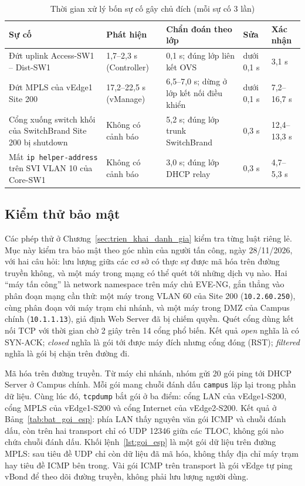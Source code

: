 \begin{table}[H]
    \centering
    \small
    \caption{Thời gian xử lý bốn sự cố gây chủ đích (mỗi sự cố 3 lần)}
    \label{tab:xu_ly_su_co}
    \begin{tabularx}{\textwidth}{|L{3.6cm}|L{2.4cm}|Y|P{1.9cm}|P{2.0cm}|}
        \hline
        \textbf{Sự cố} & \textbf{Phát hiện} & \textbf{Chẩn đoán theo lớp} & \textbf{Sửa} & \textbf{Xác nhận} \\
        \hline
        Đứt uplink Access-SW1 -- Dist-SW1 & 1,7--2,3 s (Controller) & 0,1 s; đúng lớp liên kết OVS & dưới 0,1 s & 3,1 s \\
        \hline
        Đứt MPLS của vEdge1 Site 200 & 17,2--22,5 s (vManage) & 6,5--7,0 s; dừng ở lớp kết nối điều khiển & dưới 0,1 s & 7,2--16,7 s \\
        \hline
        Cổng xuống switch khối của SwitchBrand Site 200 bị shutdown & Không có cảnh báo & 5,2 s; đúng lớp trunk SwitchBrand & 0,3 s & 12,4--13,3 s \\
        \hline
        Mất \texttt{ip helper-address} trên SVI VLAN 10 của Core-SW1 & Không có cảnh báo & 3,0 s; đúng lớp DHCP relay & 0,3 s & 4,7--5,3 s \\
        \hline
    \end{tabularx}
\end{table}

\subsection{Kiểm thử bảo mật}\label{sec:kiem_thu_bao_mat}

Các phép thử ở Chương~\ref{sec:trien_khai_danh_gia} kiểm tra từng luật riêng lẻ. Mục này kiểm tra bảo mật theo góc nhìn của người tấn công, ngày 28/11/2026, với hai câu hỏi: lưu lượng giữa các cơ sở có thực sự được mã hóa trên đường truyền không, và một máy trong mạng có thể quét tới những dịch vụ nào. Hai ``máy tấn công'' là network namespace trên máy chủ EVE-NG, gắn thẳng vào phân đoạn mạng cần thử: một máy trong VLAN 60 của Site 200 (\texttt{10.2.60.250}), cùng phân đoạn với máy trạm chi nhánh, và một máy trong DMZ của Campus chính (\texttt{10.1.1.13}), giả định Web Server đã bị chiếm quyền. Quét cổng dùng kết nối TCP với thời gian chờ 2 giây trên 14 cổng phổ biến. Kết quả \textit{open} nghĩa là có SYN-ACK; \textit{closed} nghĩa là gói tới được máy đích nhưng cổng đóng (RST); \textit{filtered} nghĩa là gói bị chặn trên đường đi.

Mã hóa trên đường truyền. Từ máy chi nhánh, nhóm gửi 20 gói ping tới DHCP Server ở Campus chính. Mỗi gói mang chuỗi đánh dấu \texttt{campus} lặp lại trong phần dữ liệu. Cùng lúc đó, \texttt{tcpdump} bắt gói ở ba điểm: cổng LAN của vEdge1-S200, cổng MPLS của vEdge1-S200 và cổng Internet của vEdge2-S200. Kết quả ở Bảng~\ref{tab:bat_goi_esp}: phía LAN thấy nguyên văn gói ICMP và chuỗi đánh dấu, còn trên hai transport chỉ có UDP 12346 giữa các TLOC, không gói nào chứa chuỗi đánh dấu. Khối lệnh~\ref{lst:goi_esp} là một gói dữ liệu trên đường MPLS: sau tiêu đề UDP chỉ còn dữ liệu đã mã hóa, không thấy địa chỉ máy trạm hay tiêu đề ICMP bên trong. Vài gói ICMP trên transport là gói vEdge tự ping vBond để theo dõi đường truyền, không phải lưu lượng người dùng.

